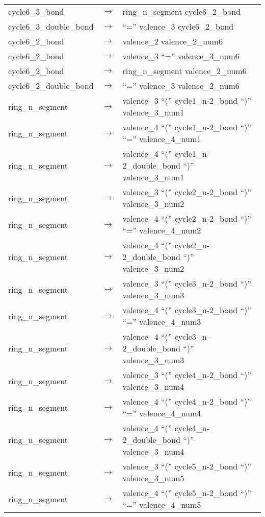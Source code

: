 \documentclass[../Document.tex]{subfiles}
\begin{document}
\begin{longtable}{m{} p{} p{}}
    cycle6\_3\_bond & $\rightarrow$ & ring\_n\_segment cycle6\_2\_bond \\
    cycle6\_3\_double\_bond & $\rightarrow$ & ``='' valence\_3 cycle6\_2\_bond \\
    cycle6\_2\_bond & $\rightarrow$ & valence\_2 valence\_2\_num6 \\
    cycle6\_2\_bond & $\rightarrow$ & valence\_3 ``='' valence\_3\_num6 \\
    cycle6\_2\_bond & $\rightarrow$ & ring\_n\_segment valence\_2\_num6 \\
    cycle6\_2\_double\_bond & $\rightarrow$ & ``='' valence\_3 valence\_2\_num6 \\
    ring\_n\_segment & $\rightarrow$ & valence\_3 ``('' cycle1\_n-2\_bond ``)'' valence\_3\_num1 \\
    ring\_n\_segment & $\rightarrow$ & valence\_4 ``('' cycle1\_n-2\_bond ``)'' ``='' valence\_4\_num1 \\
    ring\_n\_segment & $\rightarrow$ & valence\_4 ``('' cycle1\_n-2\_double\_bond ``)'' valence\_3\_num1 \\
    ring\_n\_segment & $\rightarrow$ & valence\_3 ``('' cycle2\_n-2\_bond ``)'' valence\_3\_num2 \\
    ring\_n\_segment & $\rightarrow$ & valence\_4 ``('' cycle2\_n-2\_bond ``)'' ``='' valence\_4\_num2 \\
    ring\_n\_segment & $\rightarrow$ & valence\_4 ``('' cycle2\_n-2\_double\_bond ``)'' valence\_3\_num2 \\
    ring\_n\_segment & $\rightarrow$ & valence\_3 ``('' cycle3\_n-2\_bond ``)'' valence\_3\_num3 \\
    ring\_n\_segment & $\rightarrow$ & valence\_4 ``('' cycle3\_n-2\_bond ``)'' ``='' valence\_4\_num3 \\
    ring\_n\_segment & $\rightarrow$ & valence\_4 ``('' cycle3\_n-2\_double\_bond ``)'' valence\_3\_num3 \\
    ring\_n\_segment & $\rightarrow$ & valence\_3 ``('' cycle4\_n-2\_bond ``)'' valence\_3\_num4 \\
    ring\_n\_segment & $\rightarrow$ & valence\_4 ``('' cycle4\_n-2\_bond ``)'' ``='' valence\_4\_num4 \\
    ring\_n\_segment & $\rightarrow$ & valence\_4 ``('' cycle4\_n-2\_double\_bond ``)'' valence\_3\_num4 \\
    ring\_n\_segment & $\rightarrow$ & valence\_3 ``('' cycle5\_n-2\_bond ``)'' valence\_3\_num5 \\
    ring\_n\_segment & $\rightarrow$ & valence\_4 ``('' cycle5\_n-2\_bond ``)'' ``='' valence\_4\_num5 \\

\end{longtable}
\end{document}
